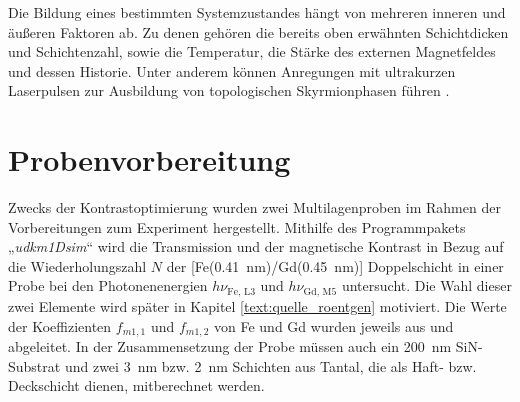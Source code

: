 \noindent
Die Bildung eines bestimmten Systemzustandes hängt von mehreren inneren und äußeren Faktoren ab. Zu denen gehören die bereits oben erwähnten Schichtdicken und Schichtenzahl, sowie die Temperatur, die Stärke des externen Magnetfeldes und dessen Historie. Unter anderem können Anregungen mit ultrakurzen Laserpulsen zur Ausbildung von topologischen Skyrmionphasen führen \cite{buttner_observation_2021}.



\section{Probenvorbereitung}
Zwecks der Kontrastoptimierung wurden zwei Multilagenproben im Rahmen der Vorbereitungen zum Experiment hergestellt. Mithilfe des Programmpakets „\emph{udkm1Dsim}“ \cite{schick_udkm1dsim_2021} wird die Transmission und der magnetische Kontrast in Bezug auf die Wiederholungszahl $N$ der [Fe(\SI{0.41}{\nano\meter})/Gd(\SI{0.45}{\nano\meter})] Doppelschicht in einer Probe bei den Photonenenergien $h\nu_{\text{Fe, L3}}$ und $h\nu_{\text{Gd, M5}}$ untersucht. Die Wahl dieser zwei Elemente wird später in Kapitel \ref{text:quelle_roentgen} motiviert. Die Werte der Koeffizienten $f_{m1,1}$ und $f_{m1,2}$ von Fe und Gd wurden jeweils aus \cite[Abb. 4]{kortright_resonant_2000} und \cite[Abb. 2]{prieto-x-ray-2005} abgeleitet. In der Zusammensetzung der Probe müssen auch ein \SI{200}{\nano\meter} SiN-Substrat und zwei \SI{3}{\nano\meter} bzw. \SI{2}{\nano\meter} Schichten aus Tantal, die als Haft- bzw. Deckschicht dienen, mitberechnet werden.


